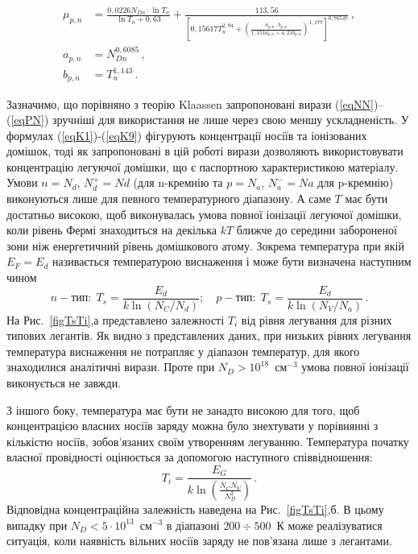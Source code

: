 \documentclass[14pt,a4paper,titlepage,oneside]{book}
\numberwithin{equation}{part}
\begin{document}
\begin{subequations} \label{eqPN}
    \begin{align}
      \mu_{p,n}& =\frac{0,0226N_{Dn}\cdot\ln T_n}{\ln T_n+0,63}
      +\frac{113,56}{\left[0,15617T_n^{2,94}+\left(\frac{a_{p,n}\cdot b_{p,n}}{1,151a_{p,n}+ 4,21 b_{p,n}}\right)^{1,177}\right]^{0,76547}}\,, \label{eqPNa} \\
      a_{p,n} &=N_{Dn}^{0,6085}\,, \label{eqPNb} \\
      b_{p,n}& =T_n^{1,143}\,. \label{eqPNc}
    \end{align}
\end{subequations}

Зазначимо, що порівняно з теорію Klaassen запропоновані вирази (\ref{eqNN})--(\ref{eqPN}) зручніші для використання не лише через свою меншу ускладненість.
У формулах (\ref{eqK1})-(\ref{eqK9}) фігурують концентрації носіїв та іонізованих домішок, тоді як запропоновані в цій роботі вирази
дозволяють використовувати концентрацію легуючої домішки, що є паспортною характеристикою матеріалу.
Умови $n=N_d$, $N_d^+=Nd$ (для n-кремнію та $p=N_a$, $N_a^-=Na$ для p-кремнію) виконуються лише для певного температурного діапазону.
А саме $T$ має бути достатньо високою, щоб виконувалась умова повної іонізації легуючої домішки,
коли рівень Фермі знаходиться на декілька $kT$ ближче до середини забороненої зони
ніж енергетичний рівень домішкового атому.
Зокрема температура при якій $E_F=E_d$ називається температурою виснаження і може бути визначена наступним чином
\begin{equation}\label{eqTs}
  n-\text{тип}:\;T_s=\frac{E_d}{k\ln(N_C/N_d)};\quad p-\text{тип}:\;T_s=\frac{E_d}{k\ln(N_V/N_a)}\,.
\end{equation}
На Рис.~\ref{figTsTi},а представлено залежності $T_i$ від рівня легування для різних типових легантів.
Як видно з представлених даних, при низьких рівнях легування температура виснаження не потрапляє
у діапазон температур, для якого знаходилися аналітичні вирази.
Проте при $N_D>10^{18}$~см$^{-3}$ умова повної іонізації виконується не завжди.



З іншого боку, температура має бути не занадто високою для того, щоб концентрацією власних носіїв заряду можна було знехтувати
у порівнянні з кількістю носіїв, зобов'язаних своїм утворенням легуванню.
Температура початку власної провідності оцінюється за допомогою наступного співвідношення:
\begin{equation}\label{eqTi}
  T_i=\frac{E_G}{k \ln\left(\frac{N_C N_V}{N_D^2}\right)}\,.
\end{equation}
Відповідна концентраційна залежність наведена на Рис.~\ref{figTsTi},б.
В цьому випадку при $N_D<5\cdot 10^{13}$~см$^{-3}$ в діапазоні $200\div500$~К може реалізуватися ситуація,
коли наявність вільних носіїв заряду не пов'язана лише з легантами.
\end{document}

